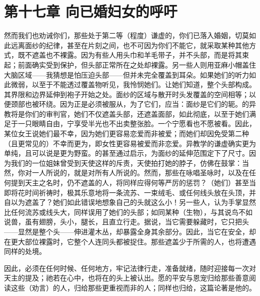 
\section{第十七章 向已婚妇女的呼吁}

然而我们也劝诫你们，那些处于第二等（程度）谦虚的，你们已落入婚姻，切莫如此远离面纱的纪律，甚至在片刻之间，也不可因为你们不能它，就采取某种其他方式，既不遮盖也不裸露。因为有些人用头巾和羊毛带子，并不头部，而是将其束起；前面确实受到保护，但头部正常所在之处却裸露。另一些人则用亚麻小帽盖住大脑区域——我猜想是怕压迫头部——但并未完全覆盖到耳朵。如果她们的听力如此微弱，以至于不能透过覆盖物听见，我怜悯她们。让她们知道，整个头部构成。其界限和边界延伸到袍子开始之处。面纱的区域与散开时头发覆盖的空间相等；以便颈部也被环绕。因为正是必须被服从，为了它们，应当：面纱是它们的轭。的异教将是你们的审判官，她们不仅遮盖头部，还遮盖面部，如此彻底，以至于她们满足于一只眼睛自由，宁享受半光也不出卖整张脸。一个宁愿看也不愿被看。因此，某位女王说她们最不幸，因为她们更容易恋爱而非被爱；而她们却因免受第二种（且更常见的）不幸而更为，即女性更容易被爱而非恋爱。异教学的谦虚确实更为单纯，且可以说是更为野蛮。的甚至通过启示，为面纱的延伸范围定下了尺寸。因为我们的一位姐妹曾受到天使这样的斥责，天使拍打她的脖子，仿佛在鼓掌：当然，你对一人所说的，就是对所有人所说的。然而，那些在咏唱圣咏时，以及在任何提到天主之名时，仍不遮盖的人，将同样应得何等严厉的惩罚？（她们）甚至当即将花时间祈祷时，极其乐意地将一条流苏、一束绒毛、或任何线头放在头顶，并自以为遮盖了？她们如此错误地想象自己的头就这么小！另一些人，认为手掌显然比任何流苏或线头大，同样误用了她们的头部；如同某种（生物），与其说鸟不如说兽，虽有翅膀，头小，腿长，且直立行走。据说，当它需要躲藏时，它只把头——显然是整个头——伸进灌木丛，却暴露全身其余部分。因此，当它在安全，却在更大部位裸露时，它整个人连同头都被捉住。那些遮盖少于所需的人，也将遭遇同样的处境。\par

因此，必须在任何时候、任何地方，牢记法律行走，准备就绪，随时迎接每一次对天主的提及；祂若在心中，也将在的头上被认出。愿的平安与恩宠归给那些善意阅读这些（劝言）的人，归给那些更重视而非的人；同样也归给，这篇论著是他的。\par

